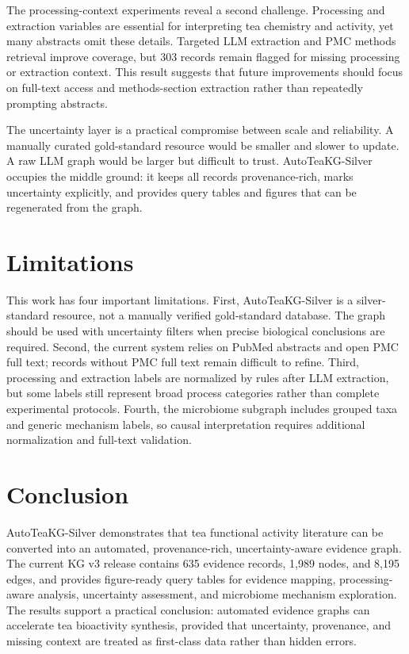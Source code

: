\documentclass[11pt]{article}
\begin{document}
The processing-context experiments reveal a second challenge. Processing and extraction variables are essential for interpreting tea chemistry and activity, yet many abstracts omit these details. Targeted LLM extraction and PMC methods retrieval improve coverage, but 303 records remain flagged for missing processing or extraction context. This result suggests that future improvements should focus on full-text access and methods-section extraction rather than repeatedly prompting abstracts.

The uncertainty layer is a practical compromise between scale and reliability. A manually curated gold-standard resource would be smaller and slower to update. A raw LLM graph would be larger but difficult to trust. AutoTeaKG-Silver occupies the middle ground: it keeps all records provenance-rich, marks uncertainty explicitly, and provides query tables and figures that can be regenerated from the graph.

\section{Limitations}

This work has four important limitations. First, AutoTeaKG-Silver is a silver-standard resource, not a manually verified gold-standard database. The graph should be used with uncertainty filters when precise biological conclusions are required. Second, the current system relies on PubMed abstracts and open PMC full text; records without PMC full text remain difficult to refine. Third, processing and extraction labels are normalized by rules after LLM extraction, but some labels still represent broad process categories rather than complete experimental protocols. Fourth, the microbiome subgraph includes grouped taxa and generic mechanism labels, so causal interpretation requires additional normalization and full-text validation.

\section{Conclusion}

AutoTeaKG-Silver demonstrates that tea functional activity literature can be converted into an automated, provenance-rich, uncertainty-aware evidence graph. The current KG v3 release contains 635 evidence records, 1,989 nodes, and 8,195 edges, and provides figure-ready query tables for evidence mapping, processing-aware analysis, uncertainty assessment, and microbiome mechanism exploration. The results support a practical conclusion: automated evidence graphs can accelerate tea bioactivity synthesis, provided that uncertainty, provenance, and missing context are treated as first-class data rather than hidden errors.
\end{document}
